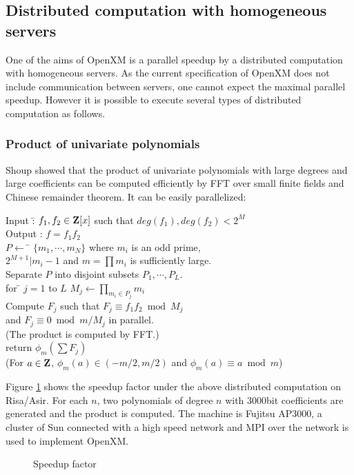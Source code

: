 
\subsection{Distributed computation with homogeneous servers}
\label{section:homog}

One of the aims of OpenXM is a parallel speedup by a distributed computation
with homogeneous servers. As the current specification of OpenXM does
not include communication between servers, one cannot expect
the maximal parallel speedup. However it is possible to execute
several types of distributed computation as follows.

\subsubsection{Product of univariate polynomials}

Shoup \cite{Shoup} showed that the product of univariate polynomials
with large degrees and large coefficients can be computed efficiently
by FFT over small finite fields and Chinese remainder theorem.
It can be easily parallelized:

\begin{tabbing}
Input :\= $f_1, f_2 \in {\bf Z}[x]$ such that $deg(f_1), deg(f_2) < 2^M$\\
Output : $f = f_1f_2$ \\
$P \leftarrow$ \= $\{m_1,\cdots,m_N\}$ where $m_i$ is an odd prime, \\
\> $2^{M+1}|m_i-1$ and $m=\prod m_i $ is sufficiently large. \\
Separate $P$ into disjoint subsets $P_1, \cdots, P_L$.\\
for \= $j=1$ to $L$ $M_j \leftarrow \prod_{m_i\in P_j} m_i$\\
Compute $F_j$ such that $F_j \equiv f_1f_2 \bmod M_j$\\
\> and $F_j \equiv 0 \bmod m/M_j$ in parallel.\\
\> (The product is computed by FFT.)\\
return $\phi_m(\sum F_j)$\\
(For $a \in {\bf Z}$, $\phi_m(a) \in (-m/2,m/2)$ and $\phi_m(a)\equiv a \bmod m$)
\end{tabbing}

Figure \ref{speedup}
shows the speedup factor under the above distributed computation
on Risa/Asir. For each $n$, two polynomials of degree $n$
with 3000bit coefficients are generated and the product is computed.
The machine is Fujitsu AP3000,
a cluster of Sun connected with a high speed network and MPI over the
network is used to implement OpenXM.
\begin{figure}[htbp]
\epsfxsize=8.5cm
\caption{Speedup factor}
\label{speedup}
\end{figure}

